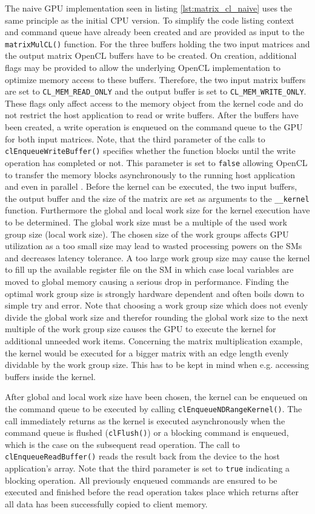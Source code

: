 The naive GPU implementation seen in listing \ref{lst:matrix_cl_naive} uses the same principle as the initial CPU version. To simplify the code listing context and command queue have already been created and are provided as input to the \lstinline!matrixMulCL()! function.
For the three buffers holding the two input matrices and the output matrix OpenCL buffers have to be created. On creation, additional flags may be provided to allow the underlying OpenCL implementation to optimize memory access to these buffers. Therefore, the two input matrix buffers are set to \lstinline!CL_MEM_READ_ONLY! and the output buffer is set to \lstinline!CL_MEM_WRITE_ONLY!. These flags only affect access to the memory object from the kernel code and do not restrict the host application to read or write buffers. 
After the buffers have been created, a write operation is enqueued on the command queue to the GPU for both input matrices. Note, that the third parameter of the calls to \lstinline!clEnqueueWriteBuffer()! specifies whether the function blocks until the write operation has completed or not. This parameter is set to \lstinline!false! allowing OpenCL to transfer the memory blocks asynchronously to the running host application and even in parallel .
Before the kernel can be executed, the two input buffers, the output buffer and the size of the matrix are set as arguments to the \lstinline!__kernel! function. Furthermore the global and local work size for the kernel execution have to be determined. The global work size must be a multiple of the used work group size (local work size). The chosen size of the work groups affects GPU utilization as a too small size may lead to wasted processing powers on the SMs and decreases latency tolerance. A too large work group size may cause the kernel to fill up the available register file on the SM in which case local variables are moved to global memory causing a serious drop in performance. Finding the optimal work group size is strongly hardware dependent and often boils down to simple try and error.
Note that choosing a work group size which does not evenly divide the global work size and therefor rounding the global work size to the next multiple of the work group size causes the GPU to execute the kernel for additional unneeded work items. Concerning the matrix multiplication example, the kernel would be executed for a bigger matrix with an edge length evenly dividable by the work group size. This has to be kept in mind when e.g. accessing buffers inside the kernel.

After global and local work size have been chosen, the kernel can be enqueued on the command queue to be executed by calling \lstinline!clEnqueueNDRangeKernel()!. The call immediately returns as the kernel is executed asynchronously when the command queue is flushed (\lstinline!clFlush()!) or a blocking command is enqueued, which is the case on the subsequent read operation. The call to \lstinline!clEnqueueReadBuffer()! reads the result back from the device to the host application's array. Note that the third parameter is set to \lstinline!true! indicating a blocking operation. All previously enqueued commands are ensured to be executed and finished before the read operation takes place which returns after all data has been successfully copied to client memory.

